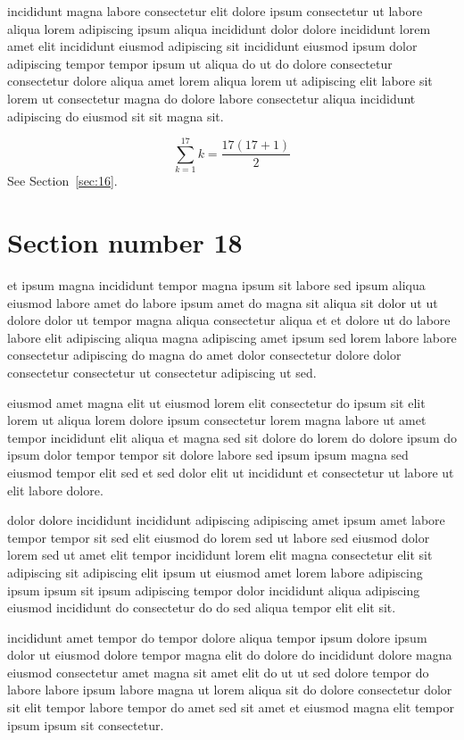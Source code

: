 \documentclass{article}
\begin{document}
incididunt magna labore consectetur elit dolore ipsum consectetur ut labore aliqua lorem adipiscing ipsum aliqua incididunt dolor dolore incididunt lorem amet elit incididunt eiusmod adipiscing sit incididunt eiusmod ipsum dolor adipiscing tempor tempor ipsum ut aliqua do ut do dolore consectetur consectetur dolore aliqua amet lorem aliqua lorem ut adipiscing elit labore sit lorem ut consectetur magna do dolore labore consectetur aliqua incididunt adipiscing do eiusmod sit sit magna sit.

\begin{equation} \sum_{k=1}^{17} k = \frac{17(17+1)}{2} \end{equation}
See Section~\ref{sec:16}.

\section{Section number 18}\label{sec:18}
et ipsum magna incididunt tempor magna ipsum sit labore sed ipsum aliqua eiusmod labore amet do labore ipsum amet do magna sit aliqua sit dolor ut ut dolore dolor ut tempor magna aliqua consectetur aliqua et et dolore ut do labore labore elit adipiscing aliqua magna adipiscing amet ipsum sed lorem labore labore consectetur adipiscing do magna do amet dolor consectetur dolore dolor consectetur consectetur ut consectetur adipiscing ut sed.

eiusmod amet magna elit ut eiusmod lorem elit consectetur do ipsum sit elit lorem ut aliqua lorem dolore ipsum consectetur lorem magna labore ut amet tempor incididunt elit aliqua et magna sed sit dolore do lorem do dolore ipsum do ipsum dolor tempor tempor sit dolore labore sed ipsum ipsum magna sed eiusmod tempor elit sed et sed dolor elit ut incididunt et consectetur ut labore ut elit labore dolore.

dolor dolore incididunt incididunt adipiscing adipiscing amet ipsum amet labore tempor tempor sit sed elit eiusmod do lorem sed ut labore sed eiusmod dolor lorem sed ut amet elit tempor incididunt lorem elit magna consectetur elit sit adipiscing sit adipiscing elit ipsum ut eiusmod amet lorem labore adipiscing ipsum ipsum sit ipsum adipiscing tempor dolor incididunt aliqua adipiscing eiusmod incididunt do consectetur do do sed aliqua tempor elit elit sit.

incididunt amet tempor do tempor dolore aliqua tempor ipsum dolore ipsum dolor ut eiusmod dolore tempor magna elit do dolore do incididunt dolore magna eiusmod consectetur amet magna sit amet elit do ut ut sed dolore tempor do labore labore ipsum labore magna ut lorem aliqua sit do dolore consectetur dolor sit elit tempor labore tempor do amet sed sit amet et eiusmod magna elit tempor ipsum ipsum sit consectetur.
\end{document}
